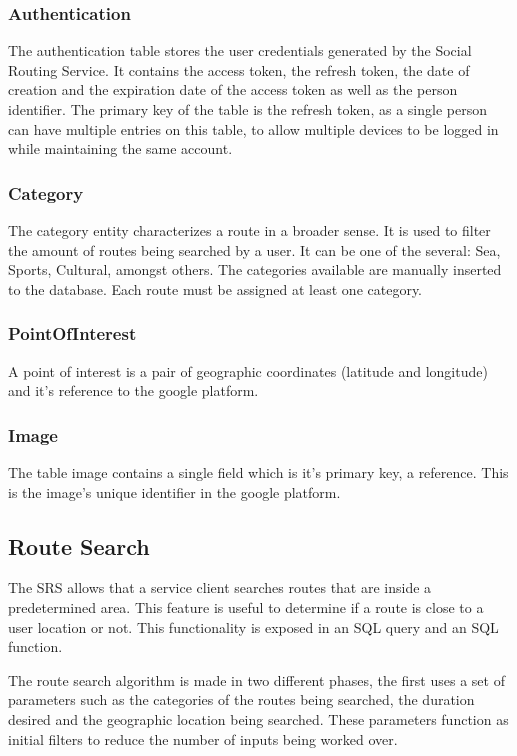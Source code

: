         \subsubsection*{Authentication}
        The authentication table stores the user credentials generated by the Social Routing Service. It contains the access token, the refresh
        token, the date of creation and the expiration date of the access token as well as the person identifier. The primary key of the table is the refresh token, as a single
        person can have multiple entries on this table, to allow multiple devices to be logged in while maintaining the same account.

        \subsubsection*{Category}
        The category entity characterizes a route in a broader sense. It is used to filter the amount of routes being 
        searched by a user. It can be one of the several: Sea, Sports, Cultural, amongst others. The categories available
        are manually inserted to the database. Each route must be assigned at least one category.

        \subsubsection*{PointOfInterest}
        A point of interest is a pair of geographic coordinates (latitude and longitude) and it's reference to the google platform.

        \subsubsection*{Image}
        The table image contains a single field which is it's primary key, a reference. This is the image's unique identifier in the google
        platform.

    \subsection{Route Search}
    The SRS allows that a service client searches routes that are inside a predetermined area. This feature is useful to determine
    if a route is close to a user location or not. This functionality is exposed in an SQL query\cite{sqlqueries} and an SQL function\cite{sqlfunctions}.
    
    The route search algorithm is made in two different phases, the first uses a set of parameters such as the categories of the routes being searched,
    the duration desired and the geographic location being searched. These parameters function as initial filters to reduce the 
    number of inputs being worked over.

